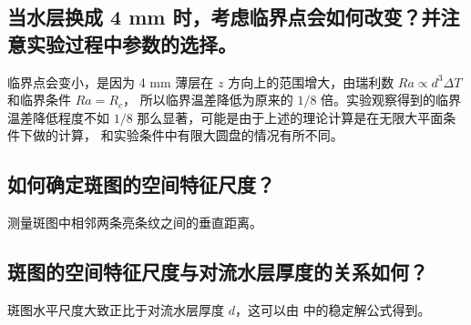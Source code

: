 \documentclass[revtex4-2]{mpltx}
\begin{document}
\subsection{当水层换成 4 mm 时，考虑临界点会如何改变？并注意实验过程中参数的选择。}
临界点会变小，是因为 4 mm 薄层在 $z$ 方向上的范围增大，由瑞利数 $Ra\propto d^3\Delta T$ 和临界条件 $Ra=R_c$，
所以临界温差降低为原来的 $1/8$ 倍。实验观察得到的临界温差降低程度不如 $1/8$ 那么显著，可能是由于上述的理论计算是在无限大平面条件下做的计算，
和实验条件中有限大圆盘的情况有所不同。
\subsection{如何确定斑图的空间特征尺度？}
测量斑图中相邻两条亮条纹之间的垂直距离。
\subsection{斑图的空间特征尺度与对流水层厚度的关系如何？}
斑图水平尺度大致正比于对流水层厚度 $d$，这可以由 \cite{jindaishiyan} 中的稳定解公式得到。
\end{document}
